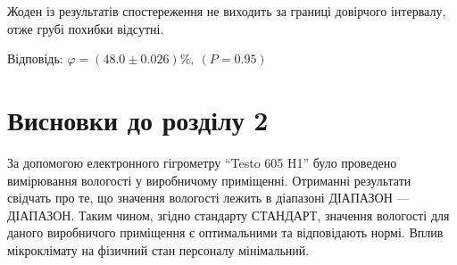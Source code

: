 Жоден із результатів спостереження не виходить за границі довірчого інтервалу, отже грубі похибки відсутні.

Відповідь: $\varphi = (48.0 \pm 0.026)\%,~(P=0.95)$

\section*{Висновки до розділу 2}

За допомогою електронного гігрометру ``Testo 605 H1'' було проведено вимірювання вологості у
виробничому приміщенні.  Отриманні результати свідчать про те, що значення вологості лежить в
діапазоні ДІАПАЗОН --- ДІАПАЗОН.  Таким чином, згідно стандарту СТАНДАРТ, значення вологості для
даного виробничого приміщення є оптимальними та відповідають нормі.  Вплив мікроклімату на фізичний
стан персоналу мінімальний.
